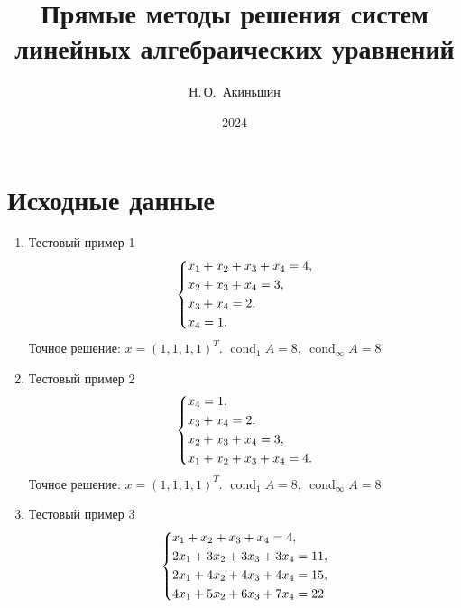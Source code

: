 \documentclass{article}
\title{Прямые методы решения систем
линейных алгебраических уравнений}
\author{Н.\,О.~Акиньшин}
\date{2024}
\newcommand{\cond}{\mathop{\mathrm{cond}}\nolimits}
\begin{document}
    \maketitle
    \newpage
    \tableofcontents
    \newpage

    \section{Исходные данные}
    \begin{enumerate}
        \item Тестовый пример 1
        \begin{equation}
            \begin{dcases}
                x_1 + x_2 + x_3 + x_4 = 4, \\
                    x_2 + x_3 + x_4 = 3, \\ 
                        x_3 + x_4 = 2, \\
                            x_4 = 1.
            \end{dcases}
        \end{equation}
        Точное решение: $x = (1, 1, 1, 1)^T$. \newline
        $\cond_1 A = 8, \  \cond_\infty A = 8$
        \item Тестовый пример 2
            \begin{equation}
                \begin{dcases}
                    x_4 = 1, \\
                    x_3 + x_4 = 2, \\
                    x_2 + x_3 + x_4 = 3, \\ 
                    x_1 + x_2 + x_3 + x_4 = 4. \\
                \end{dcases}
            \end{equation}
            Точное решение: $x = (1, 1, 1, 1)^T$. \newline
            $\cond_1 A = 8, \  \cond_\infty A = 8$
        \item Тестовый пример 3
            \begin{equation}
                \begin{dcases}
                    x_1 + x_2 + x_3 + x_4 = 4, \\ 
                    2x_1 + 3x_2 + 3x_3 + 3x_4 = 11, \\ 
                    2 x_1 + 4x_2 + 4x_3 + 4x_4 = 15, \\ 
                    4 x_1 + 5 x_2 + 6 x_3 + 7 x_4 = 22

\end{dcases}
\end{equation}
\end{enumerate}
\end{document}
